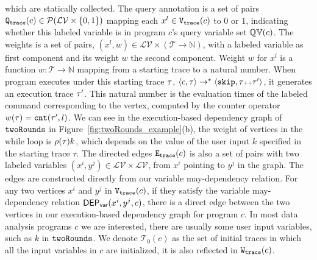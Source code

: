 {which are statically collected.
The query annotation is 
a set of pairs $\mathtt{{Q_{trace}}}(c) \in \mathcal{P}(\mathcal{LV} \times \{0, 1\} )$ 
mapping each $x^l \in \mathtt{{V_{trace}}}(c)$ to $0$ or $1$, 
indicating whether this labeled variable is in program $c$'s query variable set $\mathbb{QV}(c)$.
{
The weights is a set of pairs, $(x^l, w) \in \mathcal{LV} \times (\mathcal{T} \to \mathbb{N})$,
with a labeled variable as first component and
its weight $w$ the second component.
Weight $w$ for
$x^l$ is a function $w : \mathcal{T} \to \mathbb{N}$
mapping from a starting trace to a natural number.
When program executes under this starting trace $\mathtt{\tau}$,
$\langle {c}, \mathtt{\tau} \rangle \to^{*} \langle \mathtt{skip}, \mathtt{\tau}{\scriptscriptstyle ++}\mathtt{\tau}' \rangle $, it generates an execution trace $\mathtt{\tau}'$.
This natural number is the evaluation times of the labeled command corresponding to the vertex, 
computed by the counter operator $w(\mathtt{\tau}) = \mathtt{cnt}(\mathtt{\tau}', l)$.
We can see in the execution-based dependency graph of $\mathtt{twoRounds}$ in 
Figure~\ref{fig:twoRounds_example}(b), the weight of vertices in the while loop is  $\rho(\mathtt{\tau}) k$, which depends on the value of the user input $k$ specified in the starting trace $\tau$.
The directed edges $\mathtt{{E_{trace}}}({c})$ is also a set of pairs with two labeled variables $ (x^i, y^j) \in \mathcal{LV} \times \mathcal{LV}$, from $x^i$ pointing to $y^j$ in the graph.
The edges are constructed directly from our variable may-dependency relation. 
For any two vertices $x^{i}$ and $y^{j}$ in $\mathtt{{V_{trace}}}(c)$, if they satisfy the variable may-dependency relation $\mathsf{DEP_{var}}(x^i, y^j, c)$, there is a direct edge between the two vertices in our execution-based dependency graph for program $c$.
} 
In most data analysis programs $c$ we are interested, there are usually some user input variables, such as $k$ in $\mathtt{twoRounds}$. 
We denote $\mathcal{T}_0(c)$ as the set of initial traces in which all the input variables in $c$ are initialized, it is also reflected in $\mathtt{{W_{trace}}}({c})$.    
}
